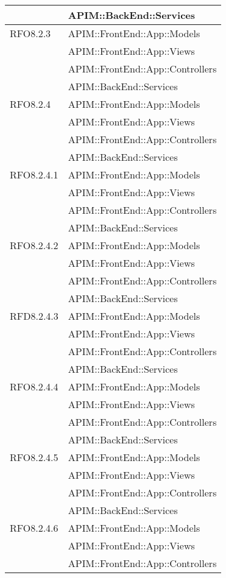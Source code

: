 \begin{longtable}{ p{4cm} | p{12cm} }
			& APIM::BackEnd::Services \\
			\hline		
			RFO8.2.3
			& APIM::FrontEnd::App::Models \\
			& APIM::FrontEnd::App::Views \\
			& APIM::FrontEnd::App::Controllers \\
			& APIM::BackEnd::Services \\
			\hline		
			RFO8.2.4
			& APIM::FrontEnd::App::Models \\
			& APIM::FrontEnd::App::Views \\
			& APIM::FrontEnd::App::Controllers \\
			& APIM::BackEnd::Services \\
			\hline		
			RFO8.2.4.1
			& APIM::FrontEnd::App::Models \\
			& APIM::FrontEnd::App::Views \\
			& APIM::FrontEnd::App::Controllers \\
			& APIM::BackEnd::Services \\
			\hline		
			RFO8.2.4.2
			& APIM::FrontEnd::App::Models \\
			& APIM::FrontEnd::App::Views \\
			& APIM::FrontEnd::App::Controllers \\
			& APIM::BackEnd::Services \\
			\hline		
			RFD8.2.4.3
			& APIM::FrontEnd::App::Models \\
			& APIM::FrontEnd::App::Views \\
			& APIM::FrontEnd::App::Controllers \\
			& APIM::BackEnd::Services \\
			\hline		
			RFO8.2.4.4
			& APIM::FrontEnd::App::Models \\
			& APIM::FrontEnd::App::Views \\
			& APIM::FrontEnd::App::Controllers \\
			& APIM::BackEnd::Services \\
			\hline		
			RFO8.2.4.5
			& APIM::FrontEnd::App::Models \\
			& APIM::FrontEnd::App::Views \\
			& APIM::FrontEnd::App::Controllers \\
			& APIM::BackEnd::Services \\
			\hline		
			RFO8.2.4.6
			& APIM::FrontEnd::App::Models \\
			& APIM::FrontEnd::App::Views \\
			& APIM::FrontEnd::App::Controllers \\

\end{longtable}
